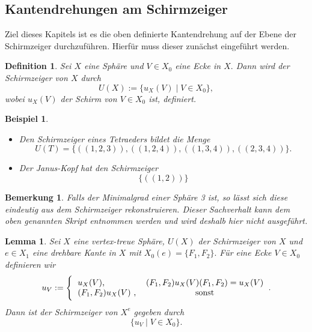 \documentclass[12pt,titlepage,twoside,cleardoublepage]{article}
\theoremstyle{nummermitklammern}
\newtheorem{lemma}[temp]{Lemma}
\newtheorem{bsp}[temp]{Beispiel}
\newtheorem{definition}[temp]{Definition}
\newtheorem{bemerkung}[temp]{Bemerkung}
\newtheorem{definition}[zahl]{Definition}
\newtheorem{lemma}[zahl]{Lemma}
\newtheorem{bsp}[zahl]{Beispiel}
\newtheorem{bemerkung}[zahl]{Bemerkung}
\numberwithin{equation}{section}
\begin{document}
\subsection{Kantendrehungen am Schirmzeiger}
Ziel dieses Kapitels ist es die oben definierte Kantendrehung auf der Ebene der Schirmzeiger durchzuführen. Hierfür muss dieser zunächst eingeführt werden.

\begin{definition}
Sei $X$ eine Sphäre und $V\in X_0$ eine Ecke in $X.$ Dann wird der \emph{Schirmzeiger} von $X$ durch 
\[
U(X):=\{u_X(V) \mid V\in X_0\},
\]
wobei $u_X(V)$ der Schirm von $V\in X_0$ ist, definiert.
\end{definition}
\begin{bsp}
\begin{itemize}
\item 
Den Schirmzeiger eines Tetraeders bildet die Menge 
\[
U(T)=\{ ((1,2,3)),((1,2,4)),((1,3,4)),((2,3,4))\}.
\]
\item Der Janus-Kopf hat den Schirmzeiger 
\[
\{((1,2))\}
\]
\end{itemize}
\end{bsp}
\begin{bemerkung}
Falls der Minimalgrad einer Sphäre 3 ist, so lässt sich diese eindeutig aus dem Schirmzeiger rekonstruieren. Dieser Sachverhalt kann dem oben genannten Skript entnommen werden und wird deshalb hier nicht ausgeführt.
\end{bemerkung}
\begin{lemma}
Sei $X$ eine vertex-treue Sphäre, $U(X)$ der Schirmzeiger von $X$ und $e\in X_1$ eine drehbare Kante in $X$ mit $X_0(e)=\{F_1,F_2\}.$ Für eine Ecke $V\in X_0$ definieren wir  
\[
u_V:=
\Biggl\{
\begin{tabular}[l]{lcr}
\text{$u_X(V)$},&$(F_1,F_2)u_X(V)(F_1,F_2)=u_X(V)$ \\
$(F_1,F_2) u_X(V)$ ,& sonst \\

\end{tabular}.
\]
Dann ist der Schirmzeiger von $X^e$ gegeben durch 
\[
\{ u_V\mid V \in X_0\}.
\]
\end{lemma}
\end{document}
